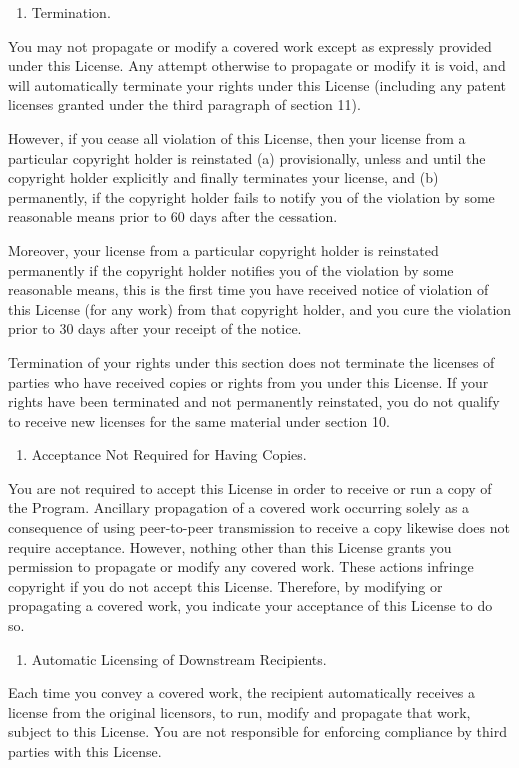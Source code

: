 \documentclass[11pt]{article}
\begin{document}
\begin{enumerate}
\item Termination.
\end{enumerate}
You may not propagate or modify a covered work except as expressly provided under this License. Any attempt otherwise to propagate or modify it is void, and will automatically terminate your rights under this License (including any patent licenses granted under the third paragraph of section 11).

However, if you cease all violation of this License, then your license from a particular copyright holder is reinstated (a) provisionally, unless and until the copyright holder explicitly and finally terminates your license, and (b) permanently, if the copyright holder fails to notify you of the violation by some reasonable means prior to 60 days after the cessation.

Moreover, your license from a particular copyright holder is reinstated permanently if the copyright holder notifies you of the violation by some reasonable means, this is the first time you have received notice of violation of this License (for any work) from that copyright holder, and you cure the violation prior to 30 days after your receipt of the notice.

Termination of your rights under this section does not terminate the licenses of parties who have received copies or rights from you under this License. If your rights have been terminated and not permanently reinstated, you do not qualify to receive new licenses for the same material under section 10.

\begin{enumerate}
\item Acceptance Not Required for Having Copies.
\end{enumerate}
You are not required to accept this License in order to receive or run a copy of the Program. Ancillary propagation of a covered work occurring solely as a consequence of using peer-to-peer transmission to receive a copy likewise does not require acceptance. However, nothing other than this License grants you permission to propagate or modify any covered work. These actions infringe copyright if you do not accept this License. Therefore, by modifying or propagating a covered work, you indicate your acceptance of this License to do so.

\begin{enumerate}
\item Automatic Licensing of Downstream Recipients.
\end{enumerate}
Each time you convey a covered work, the recipient automatically receives a license from the original licensors, to run, modify and propagate that work, subject to this License. You are not responsible for enforcing compliance by third parties with this License.
\end{document}
